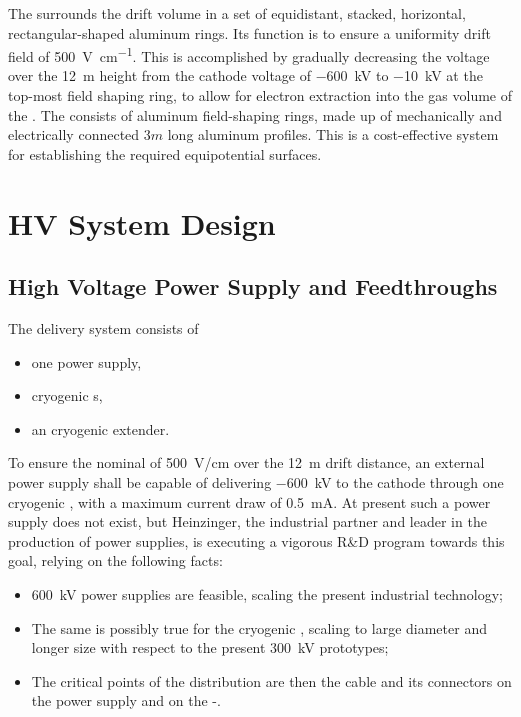 The \fc surrounds the drift volume in a set of equidistant, stacked, horizontal, rectangular-shaped aluminum rings. Its function is to ensure a uniformity drift field of \SI{500}{\V\per\cm}. This is accomplished by gradually decreasing the voltage over the \SI{12}{\m} height from the cathode voltage of \SI{-600}{\kV} to \SI{-10}{\kV} at the top-most field shaping ring, to allow for electron extraction into the gas volume of the . The \fc consists of aluminum field-shaping rings, made up of mechanically and electrically connected $3m$ long aluminum profiles.  
This is a cost-effective system for establishing the required equipotential surfaces. 

\section{HV System Design}
\label{sec:fddp-hv-design}

\subsection {High Voltage Power Supply and Feedthroughs}
The  delivery system consists of
\begin{itemize}
\item one power supply,
\item \hv cryogenic \fdth{}s,
\item an \hv cryogenic extender.
\end{itemize}

To ensure the nominal \efield of \SI{500}{V/cm} over  the \SI{12}{\m} drift distance, an external power supply shall be capable of delivering \SI{-600}{\kV} to  the cathode through one \hv cryogenic \fdth, with a maximum current draw of \SI{0.5}{\milli\ampere}.
At present such a power supply does not exist, but  Heinzinger, the industrial partner and leader in the production of \hv power supplies, is executing a vigorous R\&D program towards this goal, relying on the following facts:

\begin{itemize}
\item \SI{600}{\kV} power supplies are feasible, scaling the present industrial technology;
\item The same is possibly true for the \hv cryogenic \fdth, scaling to large diameter and longer size with respect to the present \SI{300}{\kV} prototypes;
\item The critical points of the \hv distribution are then the cable and its connectors on the power supply and on the \hv{}-\fdth. 
\end{itemize}

